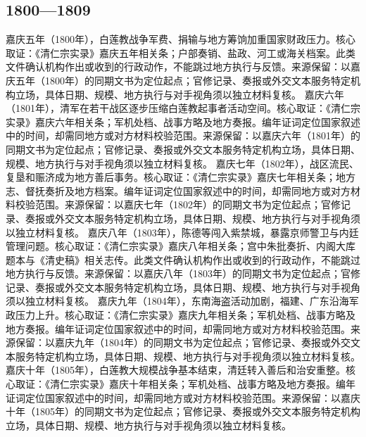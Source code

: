 \subsection{1800—1809}
嘉庆五年（1800年），白莲教战争军费、捐输与地方筹饷加重国家财政压力。核心取证：《清仁宗实录》嘉庆五年相关条；户部奏销、盐政、河工或海关档案。此类文件确认机构作出或收到的行政动作，不能跳过地方执行与反馈。来源保留：以嘉庆五年（1800年）的同期文书为定位起点；官修记录、奏报或外交文本服务特定机构立场，具体日期、规模、地方执行与对手视角须以独立材料复核。
嘉庆六年（1801年），清军在若干战区逐步压缩白莲教起事者活动空间。核心取证：《清仁宗实录》嘉庆六年相关条；军机处档、战事方略及地方奏报。编年证词定位国家叙述中的时间，却需同地方或对方材料校验范围。来源保留：以嘉庆六年（1801年）的同期文书为定位起点；官修记录、奏报或外交文本服务特定机构立场，具体日期、规模、地方执行与对手视角须以独立材料复核。
嘉庆七年（1802年），战区流民、复垦和赈济成为地方善后事务。核心取证：《清仁宗实录》嘉庆七年相关条；地方志、督抚奏折及地方档案。编年证词定位国家叙述中的时间，却需同地方或对方材料校验范围。来源保留：以嘉庆七年（1802年）的同期文书为定位起点；官修记录、奏报或外交文本服务特定机构立场，具体日期、规模、地方执行与对手视角须以独立材料复核。
嘉庆八年（1803年），陈德等闯入紫禁城，暴露京师警卫与内廷管理问题。核心取证：《清仁宗实录》嘉庆八年相关条；宫中朱批奏折、内阁大库题本与《清史稿》相关志传。此类文件确认机构作出或收到的行政动作，不能跳过地方执行与反馈。来源保留：以嘉庆八年（1803年）的同期文书为定位起点；官修记录、奏报或外交文本服务特定机构立场，具体日期、规模、地方执行与对手视角须以独立材料复核。
嘉庆九年（1804年），东南海盗活动加剧，福建、广东沿海军政压力上升。核心取证：《清仁宗实录》嘉庆九年相关条；军机处档、战事方略及地方奏报。编年证词定位国家叙述中的时间，却需同地方或对方材料校验范围。来源保留：以嘉庆九年（1804年）的同期文书为定位起点；官修记录、奏报或外交文本服务特定机构立场，具体日期、规模、地方执行与对手视角须以独立材料复核。
嘉庆十年（1805年），白莲教大规模战争基本结束，清廷转入善后和治安重整。核心取证：《清仁宗实录》嘉庆十年相关条；军机处档、战事方略及地方奏报。编年证词定位国家叙述中的时间，却需同地方或对方材料校验范围。来源保留：以嘉庆十年（1805年）的同期文书为定位起点；官修记录、奏报或外交文本服务特定机构立场，具体日期、规模、地方执行与对手视角须以独立材料复核。
